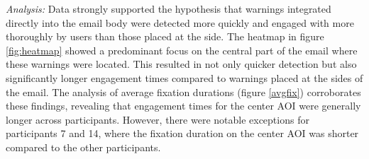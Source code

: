 \documentclass[
  a4paper,  %
  twoside,  %
  bibliography=totoc,
  headsepline,
  cleardoublepage=empty,
  parskip=half,
  draft=false
]{scrbook}
\begin{document}
\textit{Analysis:} 
Data strongly supported the hypothesis that warnings integrated directly into the email body were detected more quickly and engaged with more thoroughly by users than those placed at the side. The heatmap in figure \ref{fig:heatmap} showed a predominant focus on the central part of the email where these warnings were located. This resulted in not only quicker detection but also significantly longer engagement times compared to warnings placed at the sides of the email. \newline
The analysis of average fixation durations (figure \ref{avgfix}) corroborates these findings, revealing that engagement times for the center AOI were generally longer across participants. However, there were notable exceptions for participants 7 and 14, where the fixation duration on the center AOI was shorter compared to the other participants. 

\end{document}
